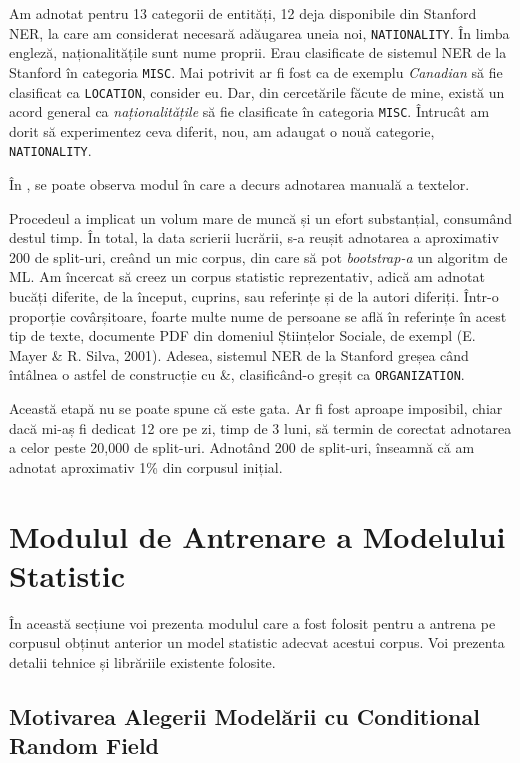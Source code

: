 Am adnotat pentru 13 categorii de entități, 12 deja disponibile din Stanford NER, la care am considerat necesară adăugarea uneia noi, \texttt{NATIONALITY}. În limba engleză, naționalitățile sunt nume proprii. Erau clasificate de sistemul NER de la Stanford în categoria \texttt{MISC}. Mai potrivit ar fi fost ca de exemplu \textit{Canadian} să fie clasificat ca \texttt{LOCATION}, consider eu. Dar, din cercetările făcute de mine, există un acord general ca \textit{naționalitățile} să fie clasificate în categoria \texttt{MISC}. Întrucât am dorit să experimentez ceva diferit, nou, am adaugat o nouă categorie, \texttt{NATIONALITY}.

În , se poate observa modul în care a decurs adnotarea manuală a textelor. 


Procedeul a implicat un volum mare de muncă și un efort substanțial, consumând destul timp. În total, la data scrierii lucrării, s-a reușit adnotarea a aproximativ 200 de split-uri, creând un mic corpus, din care să pot \textit{bootstrap-a} un algoritm de ML. Am încercat să creez un corpus statistic reprezentativ, adică am adnotat bucăți diferite, de la început, cuprins, sau referințe și de la autori diferiți. Într-o proporție covârșitoare, foarte multe nume de persoane se află în referințe în acest tip de texte, documente PDF din domeniul Științelor Sociale, de exempl (E. Mayer \& R. Silva, 2001). Adesea, sistemul NER de la Stanford greșea când întâlnea o astfel de construcție cu \&, clasificând-o greșit ca \texttt{ORGANIZATION}.

Această etapă nu se poate spune că este gata. Ar fi fost aproape imposibil, chiar dacă mi-aș fi dedicat 12 ore pe zi, timp de 3 luni, să termin de corectat adnotarea a celor peste 20,000 de split-uri. Adnotând 200 de split-uri, înseamnă că am adnotat aproximativ 1\% din corpusul inițial.

\section {Modulul de Antrenare a Modelului Statistic}

În această secțiune voi prezenta modulul care a fost folosit pentru a antrena pe corpusul obținut anterior un model statistic adecvat acestui corpus. Voi prezenta detalii tehnice și librăriile existente folosite.

\subsection{Motivarea Alegerii Modelării cu Conditional Random Field}

